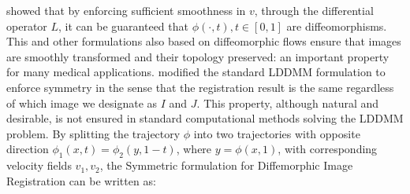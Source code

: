 \cite{Dupuis1998} showed that by enforcing sufficient smoothness in $v$, through the differential operator $L$, it can be guaranteed that $\phi(\cdot, t), t \in [0, 1]$ are diffeomorphisms. This and other formulations also based on diffeomorphic flows ensure that images are smoothly transformed and their topology preserved: an important property for many medical applications. \cite{Avants2008, Avants2011} modified the standard LDDMM formulation to enforce symmetry in the sense that the registration result is the same regardless of which image we designate as $I$ and $J$. This property, although natural and desirable, is not ensured in standard computational methods solving the LDDMM problem. By splitting the trajectory $\phi$ into two trajectories with opposite direction $\phi_{1}(x, t) = \phi_{2}(y, 1-t)$, where $y = \phi(x, 1)$, with corresponding velocity fields $v_{1}, v_{2}$, the Symmetric formulation for Diffemorphic Image Registration \citep{Avants2008, Avants2011} can be written as:

